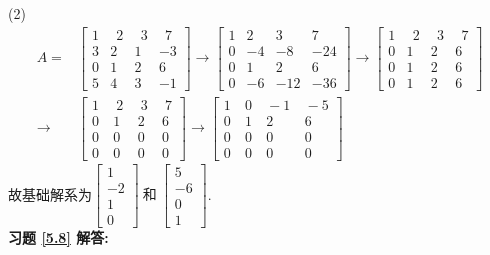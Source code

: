 (2)
\begin{displaymath}
\begin{aligned}
A=&\begin{bmatrix} 1&\ \ 2&\ \ 3&\ \ 7\\3&2&1&-3\\0&1&2&6\\5&4&3&-1   \end{bmatrix}\rightarrow
\begin{bmatrix}1&2&3&7\\0&-4&-8&-24\\0&1&2&6\\0&-6&-12&-36    \end{bmatrix}\rightarrow
\begin{bmatrix}1&\ \ 2&\ \ 3&\ \ 7\\0&1&2&6\\0&1&2&6\\0&1&2&6    \end{bmatrix}\\ \rightarrow &
\begin{bmatrix}1&\ \ 2&\ \ 3&\ \ 7\\0&\ 1&\ 2&\ 6\\0&\ 0&\ 0&\ 0\\0&\ 0&\ 0&\ 0    \end{bmatrix}\rightarrow
\begin{bmatrix}1&\ 0&\ -1&\ -5\\0&\ 1&\ 2&\ 6\\0&\ 0& \ 0&\ 0\\0&\ 0& \ 0&\ 0    \end{bmatrix}\end{aligned} \end{displaymath}
故基础解系为$\begin{bmatrix}1\\-2\\1\\0\end{bmatrix}\ \mbox{和}\ \begin{bmatrix}5\\-6\\0\\1\end{bmatrix}$.\\
\textbf{习题 \ref{5.8} 解答:}\\
